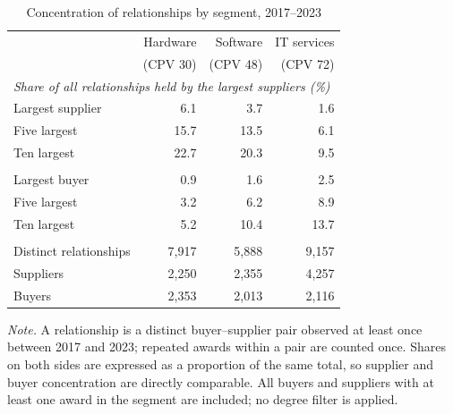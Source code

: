 \begin{table}[htbp]
\centering
\begin{threeparttable}
\caption{Concentration of relationships by segment, 2017--2023}
\label{tab:concentration}
\begin{tabular}{lrrr}
\toprule
 & Hardware & Software & IT services \\
 & (CPV 30) & (CPV 48) & (CPV 72) \\
\midrule
\multicolumn{4}{l}{\emph{Share of all relationships held by the largest suppliers (\%)}} \\
\quad Largest supplier & 6.1 & 3.7 & 1.6 \\
\quad Five largest & 15.7 & 13.5 & 6.1 \\
\quad Ten largest & 22.7 & 20.3 & 9.5 \\
\addlinespace
\multicolumn{4}{l}{\emph{Share of all relationships held by the largest buyers (\%)}} \\
\quad Largest buyer & 0.9 & 1.6 & 2.5 \\
\quad Five largest & 3.2 & 6.2 & 8.9 \\
\quad Ten largest & 5.2 & 10.4 & 13.7 \\
\addlinespace
\multicolumn{4}{l}{\emph{Segment size}} \\
\quad Distinct relationships & 7,917 & 5,888 & 9,157 \\
\quad Suppliers & 2,250 & 2,355 & 4,257 \\
\quad Buyers & 2,353 & 2,013 & 2,116 \\
\bottomrule
\end{tabular}
\begin{tablenotes}[flushleft]
\footnotesize
\item \textit{Note.} A relationship is a distinct buyer--supplier pair observed at least once between 2017 and 2023; repeated awards within a pair are counted once. Shares on both sides are expressed as a proportion of the same total, so supplier and buyer concentration are directly comparable. All buyers and suppliers with at least one award in the segment are included; no degree filter is applied.
\end{tablenotes}
\end{threeparttable}
\end{table}
